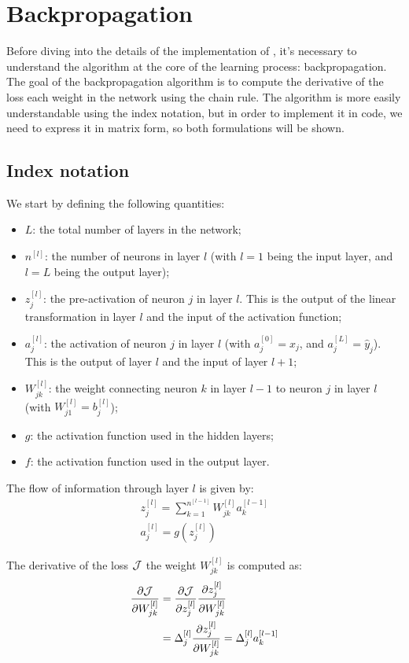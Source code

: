 \section{Backpropagation} \label{sec:backprop}
Before diving into the details of the implementation of \mfnet, it's necessary to understand the algorithm at the core of the learning process: backpropagation. The goal of the backpropagation algorithm is to compute the derivative of the loss \wrt each weight in the network using the chain rule. The algorithm is more easily understandable using the index notation, but in order to implement it in code, we need to express it in matrix form, so both formulations will be shown.


\subsection{Index notation} \label{sec:index_notation}
We start by defining the following quantities:
\begin{itemize}
    \item $L$: the total number of layers in the network;
    \item $n^{[l]}$: the number of neurons in layer $l$ (with $l = 1$ being the input layer, and $l = L$ being the output layer);
    \item $z_j^{[l]}$: the pre-activation of neuron $j$ in layer $l$. This is the output of the linear transformation in layer $l$ and the input of the activation function;
    \item $a_j^{[l]}$: the activation of neuron $j$ in layer $l$ (with $a_j^{[0]} = x_j$, and $a_j^{[L]} = \hat{y}_j$). This is the output of layer $l$ and the input of layer $l+1$;
    \item $W_{jk}^{[l]}$: the weight connecting neuron $k$ in layer $l-1$ to neuron $j$ in layer $l$ (with $W_{j1}^{[l]} = b_j^{[l]}$);
    \item $g$: the activation function used in the hidden layers;
    \item $f$: the activation function used in the output layer.
\end{itemize}

The flow of information through layer $l$ is given by:
\begin{gather*}
    z_j^{[l]} = \sum_{k=1}^{n^{[l-1]}} W_{jk}^{[l]} a_k^{[l-1]} \\
    a_j^{[l]} = g\left(z_j^{[l]}\right)
\end{gather*}

The derivative of the loss $\mathcal{J}$ \wrt the weight $W_{jk}^{[l]}$ is computed as:
\begin{align*}
    \pdv{\mathcal{J}}{W_{jk}^{[l]}} &= \pdv{\mathcal{J}}{z_j^{[l]}} \pdv{z_j^{[l]}}{W_{jk}^{[l]}}\\
    &= \Delta_j^{[l]} \pdv{z_j^{[l]}}{W_{jk}^{[l]}} = \Delta_j^{[l]} a_k^{[l-1]}
\end{align*}

